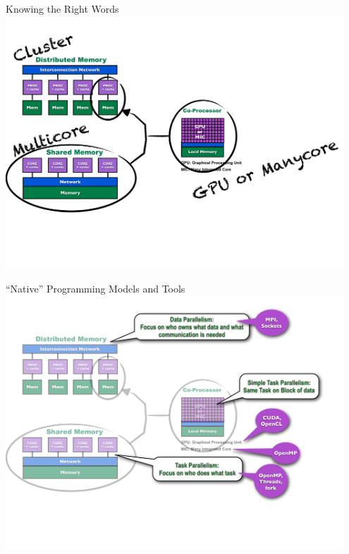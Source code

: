 \begin{frame}
\begin{block}{Knowing the Right Words}
    \includegraphics[width=0.95\textwidth]{pics/ParallelHardware5.pdf}
\end{block}
\end{frame}

\begin{frame}
\begin{block}{``Native'' Programming Models and Tools}
    \includegraphics[width=0.95\textwidth]{pics/ParallelHardware6.pdf}
\end{block}
\end{frame}

